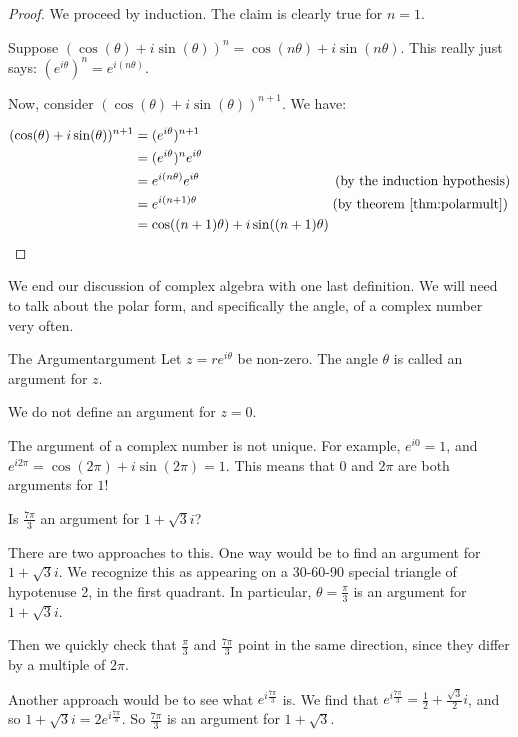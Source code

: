 \begin{proof} We proceed by induction. The claim is clearly true for $n = 1$.

Suppose $(\cos(\theta) + i\sin(\theta))^n = \cos(n\theta) + i\sin(n\theta)$. This really just says: $(e^{i\theta})^n = e^{i(n\theta)}$.

Now, consider $(\cos(\theta) + i\sin(\theta))^{n+1}$. We have:

\begin{align*} (\cos(\theta) + i\sin(\theta))^{n+1} &= (e^{i\theta})^{n+1}\\
&= (e^{i\theta})^ne^{i\theta}\\
&= e^{i(n\theta)}e^{i\theta} \qquad\qquad\qquad\qquad \qquad   (\text{by the induction hypothesis})\\
&= e^{i(n+1)\theta} \qquad \qquad\qquad \qquad\qquad 	 	 (\text{by theorem \ref{thm:polarmult}})\\
&= \cos((n+1)\theta) + i\sin((n+1)\theta)
\end{align*}
\end{proof}


We end our discussion of complex algebra with one last definition. We will need to talk about the polar form, and specifically the angle, of a complex number very often.

\begin{defbo}{The Argument}{argument} Let $z = re^{i\theta}$ be non-zero. The angle $\theta$ is called an argument for $z$.

We do not define an argument for $z = 0$.
\end{defbo}

The argument of a complex number is not unique. For example, $e^{i0} = 1$, and $e^{i2\pi} = \cos(2\pi) + i\sin(2\pi) = 1$. This means that $0$ and $2\pi$ are both arguments for $1$!

\begin{ex}{}{} Is $\frac{7\pi}{3}$ an argument for $1 + \sqrt{3}i$?

There are two approaches to this. One way would be to find an argument for $1 + \sqrt{3}i$. We recognize this as appearing on a 30-60-90 special triangle of hypotenuse 2, in the first quadrant. In particular, $\theta = \frac{\pi}{3}$ is an argument for $1 + \sqrt{3}i$.

Then we quickly check that $\frac{\pi}{3}$ and $\frac{7\pi}{3}$ point in the same direction, since they differ by a multiple of $2\pi$.

\vspace{10pt}

Another approach would be to see what $e^{i\frac{7\pi}{3}}$ is. We find that $e^{i\frac{7\pi}{3}} = \frac{1}{2} + \frac{\sqrt{3}}{2}i$, and so $1 + \sqrt{3}i = 2e^{i\frac{7\pi}{3}}$. So $\frac{7\pi}{3}$ is an argument for $1 + \sqrt{3}$.

\end{ex}

